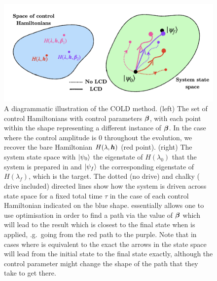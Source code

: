 \begin{figure}[t]
    \centering
    \includegraphics[width=0.8\linewidth]{images/COLD_illustration.png} \caption[A diagrammatic illustration of the COLD method]{A diagrammatic illustration of the COLD method. (left) The set of control Hamiltonians with control parameters $\boldsymbol{\beta}$, with each point within the shape representing a different instance of $\boldsymbol{\beta}$. In the case where the control amplitude is $0$ throughout the evolution, we recover the bare Hamiltonian $H(\lambda, \boldsymbol{h})$ (red point). (right) The system state space with $\ket{\psi_0}$ the eigenstate of $H(\lambda_0)$ that the system is prepared in and $\ket{\psi_f}$ the corresponding eigenstate of $H(\lambda_f)$, which is the target. The dotted (no  drive) and chalky ( drive included) directed lines show how the system is driven across state space for a fixed total time $\tau$ in the case of each control Hamiltonian indicated on the blue shape.  essentially allows one to use optimisation in order to find a path via the value of $\boldsymbol{\beta}$ which will lead to the result which is closest to the final state when  is applied, \@e.g.~going from the red path to the purple. Note that in cases where  is equivalent to the exact  the arrows in the state space will lead from the initial state to the final state exactly, although the control parameter might change the shape of the path that they take to get there.}\label{fig:COLD_illustration}
\end{figure}

